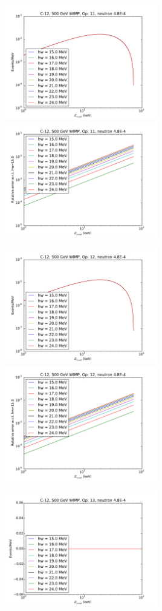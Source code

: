 \documentclass{article}
\begin{document}
\includegraphics[width=0.5\textwidth]{c12-hw-o11}
\includegraphics[width=0.5\textwidth]{c12-hw-o11-relerr}

\includegraphics[width=0.5\textwidth]{c12-hw-o12}
\includegraphics[width=0.5\textwidth]{c12-hw-o12-relerr}

\includegraphics[width=0.5\textwidth]{c12-hw-o13}
\end{document}
